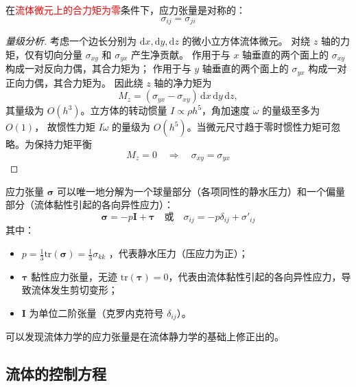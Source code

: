 \begin{proposition}
在\textcolor{red}{流体微元上的合力矩为零}条件下，应力张量是对称的：
\begin{equation}
\sigma_{ij} = \sigma_{ji}
\end{equation}
\begin{proof}[量级分析]
考虑一个边长分别为 \(\mathrm{d}x, \mathrm{d}y, \mathrm{d}z\) 的微小立方体流体微元。
对绕 \(z\) 轴的力矩，仅有切向分量 \(\sigma_{xy}\) 和 \(\sigma_{yx}\) 产生净贡献。
作用于与 \(x\) 轴垂直的两个面上的 \(\sigma_{xy}\) 构成一对反向力偶，其合力矩为；
作用于与 \(y\) 轴垂直的两个面上的 \(\sigma_{yx}\) 构成一对正向力偶，其合力矩为。
因此绕 \(z\) 轴的净力矩为
\[
M_z = (\sigma_{yx}-\sigma_{xy}) \, \mathrm{d}x \, \mathrm{d}y \, \mathrm{d}z,
\]
其量级为 \(O(h^3)\)。立方体的转动惯量 \(I \propto \rho h^5\)，角加速度 \(\dot{\omega}\) 的量级至多为 \(O(1)\)，
故惯性力矩 \(I\dot{\omega}\) 的量级为 \(O(h^5)\)。当微元尺寸趋于零时惯性力矩可忽略。为保持力矩平衡
\[
M_z = 0 \quad \Rightarrow \quad \sigma_{xy} = \sigma_{yx}
\]
\end{proof}
\end{proposition}
\begin{proposition}
    应力张量 $\boldsymbol{\sigma}$ 可以唯一地分解为一个球量部分（各项同性的静水压力）和一个偏量部分（流体黏性引起的各向异性应力）：
\begin{equation}\label{eq:stress_composition}
\boldsymbol{\sigma} = -p \mathbf{I} + \boldsymbol{\tau}\quad \text{或} \quad \sigma_{ij} = -p \delta_{ij} + \sigma'_{ij}
\end{equation}
其中：
\begin{itemize}
    \item $p = \frac{1}{3}\mathrm{tr}(\boldsymbol{\sigma}) = \frac{1}{3}\sigma_{kk}$ ，代表静水压力（压应力为正）；
    \item $\boldsymbol{\tau}$ 黏性应力张量，无迹 $\mathrm{tr}(\boldsymbol{\tau}) = 0$，代表由流体黏性引起的各向异性应力，导致流体发生剪切变形；
    \item $\mathbf{I}$ 为单位二阶张量（克罗内克符号 $\delta_{ij}$）。
\end{itemize}
\end{proposition}
\begin{note}
    可以发现流体力学的应力张量是在流体静力学的基础上修正出的。
\end{note}

\subsection{流体的控制方程} 
